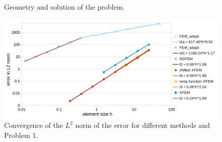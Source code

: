 \documentclass{elsarticle}
\newcommand{\prob}[1]{Problem~{#1}}
\begin{document}
\begin{figure}[!htb]
  \centering    
  \hspace{5pt}
  \caption[]
  {Geometry and solution of the problem.}
\end{figure}


\begin{figure}[!htb]
  \centering    
  \includegraphics[width=\textwidth]{results/convergence.pdf}
  \caption[Convergence graph \prob{1}]{Convergence of the $L^2$ norm of the error for different methods and Problem 1.}
  \label{fig:convergence}
\end{figure}
\end{document}
